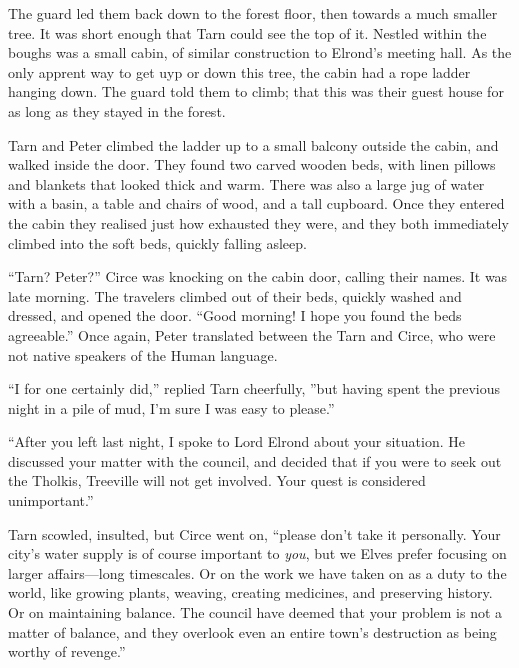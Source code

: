The guard led them back down to the forest floor, then towards a much smaller tree.  It was short enough that Tarn could see the top of it.  Nestled within the boughs was a small cabin, of similar construction to Elrond's meeting hall.  As the only apprent way to get uyp or down this tree, the cabin had a rope ladder hanging down.  The guard told them to climb; that this was their guest house for as long as they stayed in the forest.

Tarn and Peter climbed the ladder up to a small balcony outside the cabin, and walked inside the door.  They found two carved wooden beds, with linen pillows and blankets that looked thick and warm.  There was also a large jug of water with a basin, a table and chairs of wood, and a tall cupboard.  Once they entered the cabin they realised just how exhausted they were, and they both immediately climbed into the soft beds, quickly falling asleep.


``Tarn?  Peter?''  Circe was knocking on the cabin door, calling their names.  It was late morning.  The travelers climbed out of their beds, quickly washed and dressed, and opened the door.  ``Good morning!  I hope you found the beds agreeable.''  Once again, Peter translated between the Tarn and Circe, who were not native speakers of the Human language.

``I for one certainly did,'' replied Tarn cheerfully, ''but having spent the previous night in a pile of mud, I'm sure I was easy to please.''

``After you left last night, I spoke to Lord Elrond about your situation.  He discussed your matter with the council, and decided that if you were to seek out the Tholkis, Treeville will not get involved.  Your quest is considered unimportant.''

Tarn scowled, insulted, but Circe went on, ``please don't take it personally.  Your city's water supply is of course important to \emph{you}, but we Elves prefer focusing on larger affairs---long timescales.  Or on the work we have taken on as a duty to the world, like growing plants, weaving, creating medicines, and preserving history.  Or on maintaining balance.  The council have deemed that your problem is not a matter of balance, and they overlook even an entire town's destruction as being worthy of revenge.''

